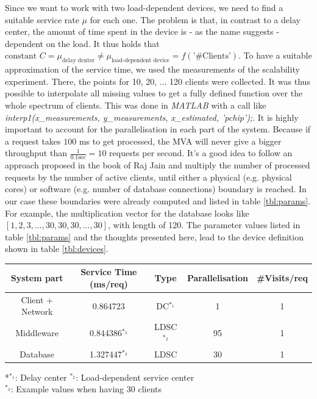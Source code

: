 \documentclass[11pt]{article}
\begin{document}
Since we want to work with two load-dependent devices, we need to find a suitable service rate $\mu$ for each one. The problem is that, in contrast to a delay center, the amount of time spent in the device is - as the name suggests - dependent on the load. It thus holds that $\text{constant }C=\mu_{\text{delay denter}}\neq\mu_{\text{load-dependent device}}=f(\text{'\#Clients'})$. To have a suitable approximation of the service time, we used the measurements of the scalability experiment. There, the points for 10, 20, ... 120 clients were collected. It was thus possible to interpolate all missing values to get a fully defined function over the whole spectrum of clients. This was done in \textit{MATLAB} with a call like \textit{interp1(x\_measurements, y\_measurements, x\_estimated, 'pchip');}. It is highly important to account for the parallelisation in each part of the system. Because if a request takes $100$ ms to get processed, the MVA will never give a bigger throughput than $\frac{1}{0.1\text{sec}}=10$ requests per second. It's a good idea to follow an approach proposed in the book of Raj Jain and multiply the number of processed requests by the number of active clients, until either a physical (e.g. physical cores) or software (e.g. number of database connections) boundary is reached. In our case these boundaries were already computed and listed in table \ref{tbl:params}. For example, the multiplication vector for the database looks like $[1,2,3,...,30,30,30,...,30]$, with length of 120. The parameter values listed in table \ref{tbl:params} and the thoughts presented here, lead to the device definition shown in table \ref{tbl:devices}.

\begin{center}
	\begin{tabular}{c|c|c|c|c}
		\hline
		System part & Service Time (ms/req) & Type & Parallelisation & \#Visits/req\\
		\hline
		Client + Network & 0.864723 & DC$^{*_1}$ & 1 & 1\\
		Middleware & 0.844386$^{*_3}$ & LDSC$^{*_2}$ & 95 & 1 \\
		Database & 1.327447$^{*_3}$ & LDSC & 30 & 1 \\
		\hline
	\end{tabular}
	\label{tbl:devices}
	*{$^{*_1}$: Delay center $^{*_2}$: Load-dependent service center \\$^{*_3}$: Example values when having 30 clients}
\end{center}
\end{document}
